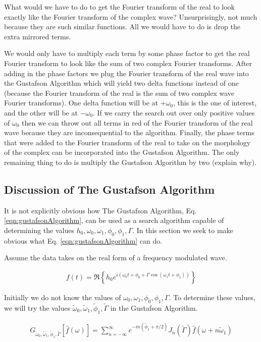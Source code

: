 \documentclass[onecolumn, groupedaddress, 10pt]{revtex4-1}
\begin{document}
What would we have to do to get the Fourier transform of the real to look exactly like the Fourier transform of the complex wave?  Unsurprisingly, not much because they are such similar functions.  All we would have to do is drop the extra mirrored terms.


We would only have to multiply each term by some phase factor to get the real Fourier transform to look like the sum of two complex Fourier transforms.  After adding in the phase factors we plug the Fourier transform of the real wave into the Gustafson Algorithm which will yield two delta functions instead of one (because the Fourier transform of the real is the sum of two complex wave Fourier transforms).  One delta function will be at $+\omega_0$, this is the one of interest, and the other will be at $-\omega_0$. If we carry the search out over only positive values of $\omega_0$ then we can throw out all terms in red of the Fourier transform of the real wave because they are inconsequential to the algorithm.  Finally, the phase terms that were added to the Fourier transform of the real to take on the morphology of the complex can be incorporated into the Gustafson Algorithm.  The only remaining thing to do is multiply the Gustafson Algorithm by two (explain why).


\subsection{Discussion of The Gustafson Algorithm}
It is not explicitly obvious how The Gustafson Algorithm, Eq. \ref{eqn:gustafsonAlgorithm}, can be used as a search algorithm capable of determining the values $h_0, \omega_0, \omega_1, \phi_0, \phi_1, \Gamma$.  In this section we seek to make obvious what Eq. \ref{eqn:gustafsonAlgorithm} can do.  

Assume the data takes on the real form of a frequency modulated wave.

\begin{align}
\label{eqn:realData}
f(t) = \Re \left\{ h_0 e^{i\left( \omega_0 t + \phi_0 + \Gamma \cos( \omega_1 t + \phi_1 ) \right)} \right\}
\end{align}

Initially we do not know the values of $\omega_0, \omega_1, \phi_0, \phi_1, \Gamma$.  To determine these values, we will try the values $\widetilde{\omega}_0, \widetilde{\omega}_1, \widetilde{\phi}_1, \widetilde{\Gamma}$ in the Gustafson Algorithm.

\begin{align}
G_{\widetilde{\omega}_0,\widetilde{\omega}_1,\widetilde{\phi}_1,\widetilde{\Gamma}} \left[ \hat{f}(\omega) \right] 
= \sum_{n=-\infty}^{\infty} e^{-in(\widetilde{\phi}_1+\pi/2)} J_n(\widetilde{\Gamma}) \hat{f} (\omega + n\widetilde{\omega}_1)
\end{align}
\end{document}
